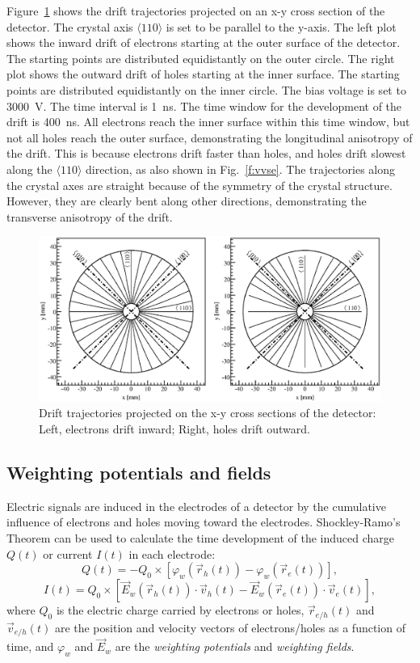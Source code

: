 \documentclass[epj]{svjour}
\begin{document}
Figure~\ref{f:trjs} shows the drift trajectories projected on an x-y
cross section of the detector. The crystal axis $\langle 110 \rangle$
is set to be parallel to the y-axis. The left plot shows the inward
drift of electrons starting at the outer surface of the detector. The
starting points are distributed equidistantly on the outer circle.
The right plot shows the outward drift of holes starting at the inner
surface. The starting points are distributed equidistantly on the
inner circle. The bias voltage is set to 3000~V. The time interval is
1~ns. The time window for the development of the drift is 400~ns. All
electrons reach the inner surface within this time window, but not all
holes reach the outer surface, demonstrating the longitudinal
anisotropy of the drift. This is because electrons drift faster than
holes, and holes drift slowest along the $\langle 110 \rangle$
direction, as also shown in Fig.~\ref{f:vvse}. The trajectories along
the crystal axes are straight because of the symmetry of the crystal
structure. However, they are clearly bent along other directions,
demonstrating the transverse anisotropy of the drift.
\begin{figure}[tb]
\centering
\includegraphics[width=0.8\linewidth]{trjs} 
\caption{Drift trajectories projected on the x-y cross sections of the
detector: Left, electrons drift inward; Right, holes drift outward.}
\label{f:trjs} 
\end{figure} 
 
\subsection{Weighting potentials and fields}
\label{s:wei}
Electric signals are induced in the electrodes of a detector by the
cumulative influence of electrons and holes moving toward the
electrodes. Shockley-Ramo's Theorem \cite{Gat82,Rad88,He00} can be
used to calculate the time development of the induced charge $Q(t)$ or
current $I(t)$ in each electrode:
\begin{equation} 
\label{e:ramoq}
Q(t) = -Q_{0} \times [\varphi_{w}(\vec{r}_{h}(t)) -
\varphi_{w}(\vec{r}_{e}(t))],
\end{equation}
\begin{equation} 
\label{e:ramoi}
I(t) = Q_{0} \times [\vec{E}_{w}(\vec{r}_{h}(t)) \cdot 
\vec{v}_{h}(t) - \vec{E}_{w}(\vec{r}_{e}(t)) \cdot 
\vec{v}_{e}(t)],
\end{equation}
where $Q_{0}$ is the electric charge carried by electrons or holes,
$\vec{r}_{e/h}(t)$ and $\vec{v}_{e/h}(t)$ are the position and
velocity vectors of electrons/holes as a function of time, and
$\varphi_{w}$ and $\vec{E}_{w}$ are the \emph{weighting potentials}
and \emph{weighting fields}.
\end{document}
